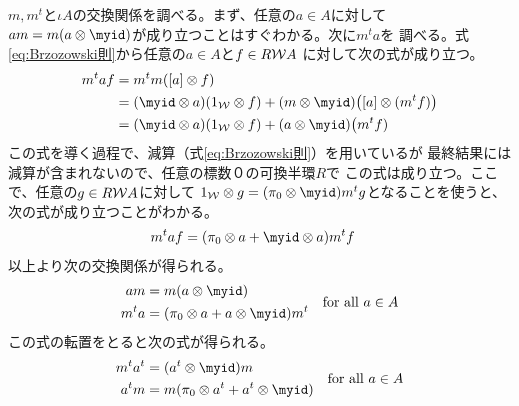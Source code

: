 	$m,m^t$と$\iota A$の交換関係を調べる。まず、任意の$a\in A$に対して
	$am=m(a\otimes \myid)$が成り立つことはすぐわかる。次に$m^ta$を
	調べる。式\eqref{eq:Brzozowski則}から任意の$a\in A$と$f\in R\mathcal{W}{A}$
	に対して次の式が成り立つ。
	\begin{equation*}\begin{split} %
		m^taf &= m^tm(\word{a}\otimes f) \\
		&= (\myid\otimes a)(\wordu{}\otimes f)
			+ (m\otimes \myid)\bigl(\word{a}\otimes (m^tf)\bigr) \\
		&= (\myid\otimes a)(\wordu{}\otimes f)
			+ (a\otimes \myid)\bigl(m^tf) \\
	\end{split}\end{equation*} %
	この式を導く過程で、減算（式\eqref{eq:Brzozowski則}）を用いているが
	最終結果には減算が含まれないので、任意の標数０の可換半環$R$で
	この式は成り立つ。ここで、任意の$g\in R\mathcal{W}{A}$に対して
	$\wordu{}\otimes g=(\pi_0\otimes \myid)m^tg$となることを使うと、
	次の式が成り立つことがわかる。
	\begin{equation*}\begin{split} %
		m^taf &= (\pi_0\otimes a + \myid\otimes a)m^tf
	\end{split}\end{equation*} %
	以上より次の交換関係が得られる。
	\begin{equation}\label{eq:文字の連結と文字列の積}\begin{split} %
		am &= m(a\otimes \myid) \\
		m^ta &= (\pi_0\otimes a + a\otimes \myid)m^t \\
	\end{split}
	\quad\text{for all }a\in A
	\end{equation} %
	この式の転置をとると次の式が得られる。
	\begin{equation}\label{eq:文字の連結と文字列の積その二}\begin{split} %
		m^ta^t &= (a^t\otimes \myid)m \\
		a^tm &= m(\pi_0\otimes a^t + a^t\otimes \myid) \\
	\end{split}
	\quad\text{for all }a\in A
	\end{equation} %

